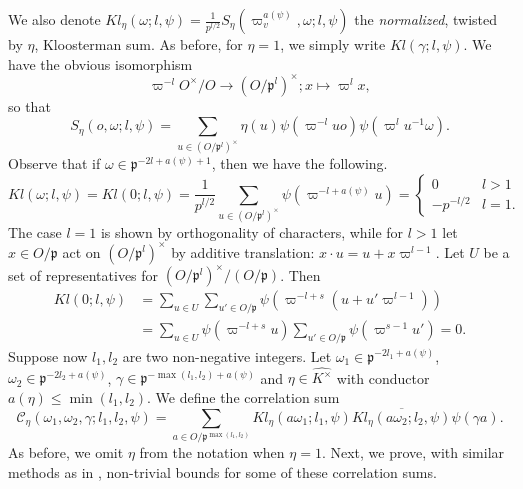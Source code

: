 \documentclass[a4paper,11pt]{amsart}
\theoremstyle{definition}
\begin{document}
   We also denote $Kl_{\eta}(\omega;l,\psi) = \frac{1}{p^{l/2}}S_{\eta}(\varpi_v^{a(\psi)},\omega;l,\psi)$ the \emph{normalized}, twisted by $\eta$, Kloosterman sum. As before, for $\eta=1$, we simply write $Kl(\gamma;l,\psi)$.  We have the obvious isomorphism
    \[\varpi^{-l}O^{\times}/O\to (O/\mathfrak{p}^l)^{\times}; x \mapsto \varpi^lx, \]
    so that 
    \[S_{\eta}(o ,\omega;l,\psi) = \sum_{u\in (O/\mathfrak{p}^l)^{\times}}\eta(u)\psi(\varpi^{-l}uo)\psi(\varpi^lu^{-1}\omega). \]  
    Observe that if $\omega\in \mathfrak{p}^{-2l+a(\psi)+1}$, then we have the following. 
     \begin{equation}\label{eq:trivialitykloosterman}    Kl(\omega;l,\psi) = Kl(0;l,\psi) = 
        \frac{1}{p^{l/2}}\sum_{u\in (O/\mathfrak{p}^l)^{\times}}\psi(\varpi^{-l+a(\psi)}u) 
        = \begin{cases}    0 &l>1\\-p^{-l/2}&l=1.\end{cases}  \end{equation}
  The case $l=1$ is shown by orthogonality of characters, while for $l>1$ let $x\in O/\mathfrak{p}$ act on $(O/\mathfrak{p}^l)^{\times}$ by additive translation: $x\cdot u = u+x\varpi^{l-1}$. Let $U$ be a set of representatives for $(O/\mathfrak{p}^l)^{\times}/(O/\mathfrak{p})$. Then \begin{align*} Kl(0;l,\psi) &= \sum_{u\in U}\sum_{u'\in O/\mathfrak{p}}\psi(\varpi^{-l+s}(u+u'\varpi^{l-1})) \\&= \sum_{u\in U}\psi(\varpi^{-l+s}u)\sum_{u'\in O/\mathfrak{p}}\psi(\varpi^{s-1}u') = 0.  \end{align*}
    Suppose now $l_1,l_2 $ are two non-negative integers. Let $\omega_1\in \mathfrak{p}^{-2l_1+a(\psi)}$, $\omega_2 \in \mathfrak{p}^{-2l_2+a(\psi)}$, $\gamma \in \mathfrak{p}^{-\max(l_1,l_2)+a(\psi)}$ and $\eta\in \widehat{K^{\times}}$ with conductor $a(\eta)\leq \min(l_1,l_2)$. 
    We define the correlation sum
    \[\mathcal{C}_{\eta}(\omega_1,\omega_2,\gamma;l_1,l_2,\psi) = \sum_{a\in O/\mathfrak{p}^{\max(l_1,l_2)}}Kl_{\eta}(a\omega_1;l_1,\psi)\overline{Kl_{\eta}(a\omega_2;l_2,\psi)}\psi(\gamma a). \] 
    As before, we omit $\eta$ from the notation when $\eta =1$. Next, we prove, with similar methods as in \cite[Appendix A]{nelsonholowinsky}, non-trivial bounds for some of these correlation sums.
\end{document}
